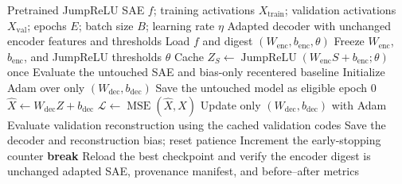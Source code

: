 \begin{algorithm}[H]
\caption{Decoder-only adaptation of the pretrained SAE}
\label{alg:decoder-only-adaptation}
\begin{algorithmic}[1]
\Require Pretrained JumpReLU SAE $f$; training activations $X_{\mathrm{train}}$;
validation activations $X_{\mathrm{val}}$; epochs $E$; batch size $B$; learning rate $\eta$
\Ensure Adapted decoder with unchanged encoder features and thresholds
\State Load $f$ and digest $(W_{\mathrm{enc}},b_{\mathrm{enc}},\theta)$
\State Freeze $W_{\mathrm{enc}}$, $b_{\mathrm{enc}}$, and JumpReLU thresholds $\theta$
    \State Cache $Z_S\gets\operatorname{JumpReLU}(W_{\mathrm{enc}}S+b_{\mathrm{enc}};\theta)$ once
\EndFor
\State Evaluate the untouched SAE and bias-only recentered baseline
\State Initialize Adam over only $(W_{\mathrm{dec}},b_{\mathrm{dec}})$
\State Save the untouched model as eligible epoch 0
        \State $\widehat{X}\gets W_{\mathrm{dec}}Z+b_{\mathrm{dec}}$
        \State $\mathcal{L}\gets\operatorname{MSE}(\widehat{X},X)$
        \State Update only $(W_{\mathrm{dec}},b_{\mathrm{dec}})$ with Adam
    \EndFor
    \State Evaluate validation reconstruction using the cached validation codes
        \State Save the decoder and reconstruction bias; reset patience
    \Else
        \State Increment the early-stopping counter
    \EndIf
        \State \textbf{break}
    \EndIf
\EndFor
\State Reload the best checkpoint and verify the encoder digest is unchanged
\State \Return adapted SAE, provenance manifest, and before--after metrics
\end{algorithmic}
\end{algorithm}
